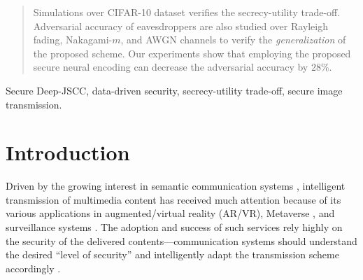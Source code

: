 \documentclass[conference]{IEEEtran}
\begin{document}
\begin{abstract}
		Simulations over CIFAR-10  dataset  verifies the secrecy-utility trade-off.  Adversarial accuracy of eavesdroppers are also studied over Rayleigh fading, Nakagami-$m$, and  AWGN channels to verify the \emph{generalization} of the proposed scheme.  
Our experiments show  that  employing the proposed secure neural encoding can decrease the adversarial accuracy by $28\%$. 
	\end{abstract}
	
	
	\begin{IEEEkeywords}
	Secure Deep-JSCC, data-driven security, secrecy-utility trade-off, secure image transmission.  
	\end{IEEEkeywords}
	
	\IEEEpeerreviewmaketitle
	\vspace{-2mm}
	
	\section{Introduction} 
	\vspace{-1mm} 
	Driven by the growing interest in semantic communication systems \cite{SC},  intelligent   transmission of multimedia content
	has received much attention because of its various applications in  augmented/virtual reality (AR/VR),   Metaverse \cite{AdHoc}, and surveillance systems \cite{Im-retriev-deniz, caching}.      
	The adoption and success of such services rely highly on the security of the delivered contents---communication  systems  should understand the desired ``level of security'' and intelligently adapt the transmission scheme  accordingly \cite{arxive, medical}. 
	
\end{document}
